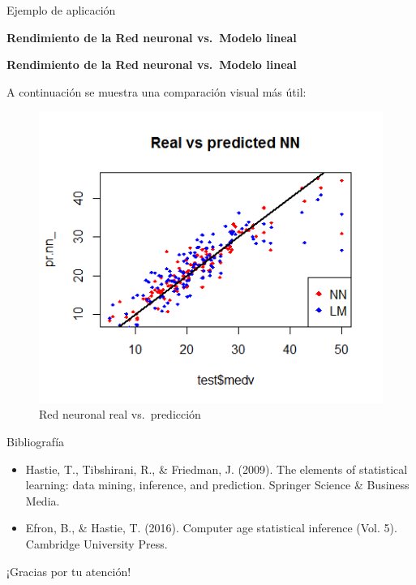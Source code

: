 \documentclass[
  ignorenonframetext,
]{beamer}
\begin{document}
\begin{frame}[fragile]{Ejemplo de aplicación}
\begin{block}{}
\begin{block}{\textbf{Rendimiento de la Red neuronal vs.~Modelo lineal}}
\end{block}

\end{block}

\begin{block}{}

\begin{block}{\textbf{Rendimiento de la Red neuronal vs.~Modelo lineal}}

A continuación se muestra una comparación visual más útil:

\begin{figure}
\centering
\includegraphics[width=5.20833in,height=\textheight]{salida2.png}
\caption{Red neuronal real vs.~predicción}
\end{figure}

\end{block}

\end{block}

\begin{block}{Bibliografía}

\begin{itemize}
\item
  Hastie, T., Tibshirani, R., \& Friedman, J. (2009). The elements of
  statistical learning: data mining, inference, and prediction. Springer
  Science \& Business Media.
\item
  Efron, B., \& Hastie, T. (2016). Computer age statistical inference
  (Vol. 5). Cambridge University Press.
\end{itemize}

\end{block}

\end{frame}

\begin{frame}{¡Gracias por tu atención!}
\protect\hypertarget{gracias-por-tu-atenciuxf3n}{}

\end{frame}
\end{document}
